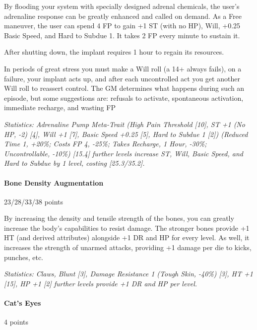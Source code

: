 \begin{multicols*}{3}
	By flooding your system with specially designed adrenal chemicals, the user's adrenaline response can be greatly enhanced and called on demand. As a Free maneuver, the user can spend 4 FP to gain +1 ST (with no HP), Will, +0.25 Basic Speed, and Hard to Subdue 1. It takes 2 FP every minute to sustain it. 
	
	After shutting down, the implant requires 1 hour to regain its resources. 
	
	In periods of great stress you must make a Will roll (a 14+ always fails), on a failure, your implant acts up, and after each uncontrolled act you get another Will roll to reassert control. The GM determines what happens during such an episode, but some suggestions are: refusals to activate, spontaneous activation, immediate recharge, and wasting FP
	
	\textit{\textcolor{OliveGreen}{Statistics: Adrenaline Pump Meta-Trait (High Pain Threshold [10], ST +1 (No HP, -2) [4], Will +1 [7], Basic Speed +0.25 [5], Hard to Subdue 1 [2]) (Reduced Time 1, +20\%; Costs FP 4, -25\%; Takes Recharge, 1 Hour, -30\%; Uncontrollable, -10\%) [15.4] further levels increase ST, Will, Basic Speed, and Hard to Subdue by 1 level, costing [25.3/35.2].}}
	
	\paragraph{Bone Density Augmentation}
	\begin{flushright}
		23/28/33/38 points
	\end{flushright}
	
	By increasing the density and tensile strength of the bones, you can greatly increase the body's capabilities to resist damage. The stronger bones provide +1 HT (and derived attributes) alongside +1 DR and HP for every level. As well, it increases the strength of unarmed attacks, providing +1 damage per die to kicks, punches, etc.
	
	\textit{\textcolor{OliveGreen}{Statistics: Claws, Blunt [3], Damage Resistance 1 (Tough Skin, -40\%) [3], HT +1 [15], HP +1 [2] further levels provide +1 DR and HP per level.}}
	
	\paragraph{Cat's Eyes}
	\begin{flushright}
		4 points
	\end{flushright}
	

\end{multicols*}
